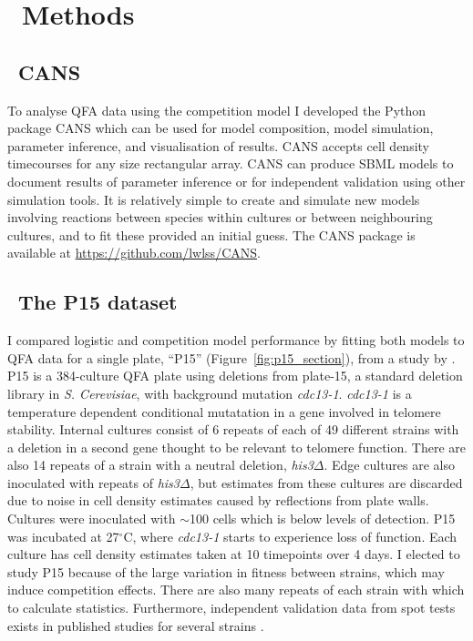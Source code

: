 \graphicspath{{images/}}

\section{\thesection~Methods}
\label{sec:methods}

\subsection{\thesubsection~CANS}

To analyse QFA data using the competition model I developed the Python
package CANS which can be used for model composition, model
simulation, parameter inference, and visualisation of results. CANS
accepts cell density timecourses for any size rectangular array. CANS
can produce SBML models to document results of parameter inference or
for independent validation using other simulation tools. It is
relatively simple to create and simulate new models involving
reactions between species within cultures or between neighbouring
cultures, and to fit these provided an initial guess. The CANS package
is available at
\href{https://github.com/lwlss/CANS}{https://github.com/lwlss/CANS}.



\subsection{\thesubsection~The P15 dataset}
\label{sec:P15_description}

I compared logistic and competition model performance by fitting both
models to QFA data for a single plate, ``P15''
(Figure~\ref{fig:p15_section}), from a study by
\citet{Addinall2011}. P15 is a 384-culture QFA plate using deletions
from plate-15, a standard deletion library in \textit{S. Cerevisiae},
with background mutation \textit{cdc13-1}. \textit{cdc13-1} is a
temperature dependent conditional mutatation in a gene involved in
telomere stability. Internal cultures consist of 6 repeats of each of
49 different strains with a deletion in a second gene thought to be
relevant to telomere function. There are also 14 repeats of a strain
with a neutral deletion, \textit{his3}\(\Delta\). Edge cultures are
also inoculated with repeats of \textit{his3}\(\Delta\), but estimates
from these cultures are discarded due to noise in cell density
estimates caused by reflections from plate walls. Cultures were
inoculated with \(\sim\)100 cells which is below levels of
detection. P15 was incubated at 27\(^{\circ}\)C, where
\textit{cdc13-1} starts to experience loss of function. Each culture
has cell density estimates taken at 10 timepoints over 4 days. I
elected to study P15 because of the large variation in fitness between
strains, which may induce competition effects. There are also many
repeats of each strain with which to calculate
statistics. Furthermore, independent validation data from spot tests
exists in published studies for several strains
\citep{maringele2002exo1,zubko2004exo1,Holstein20141259,foster2006mrx}.


